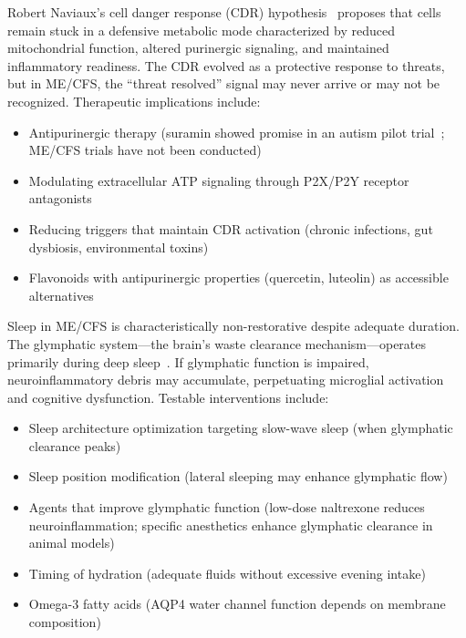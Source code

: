 \begin{hypothesis}
Robert Naviaux's cell danger response (CDR) hypothesis~\cite{Naviaux2014cdr} proposes that cells remain stuck in a defensive metabolic mode characterized by reduced mitochondrial function, altered purinergic signaling, and maintained inflammatory readiness. The CDR evolved as a protective response to threats, but in ME/CFS, the ``threat resolved'' signal may never arrive or may not be recognized. Therapeutic implications include:
\begin{itemize}
    \item Antipurinergic therapy (suramin showed promise in an autism pilot trial~\cite{Naviaux2018suraminpilot}; ME/CFS trials have not been conducted)
    \item Modulating extracellular ATP signaling through P2X/P2Y receptor antagonists
    \item Reducing triggers that maintain CDR activation (chronic infections, gut dysbiosis, environmental toxins)
    \item Flavonoids with antipurinergic properties (quercetin, luteolin) as accessible alternatives
\end{itemize}
\end{hypothesis}

\begin{hypothesis}
Sleep in ME/CFS is characteristically non-restorative despite adequate duration. The glymphatic system---the brain's waste clearance mechanism---operates primarily during deep sleep~\cite{Xie2013glymphatic}. If glymphatic function is impaired, neuroinflammatory debris may accumulate, perpetuating microglial activation and cognitive dysfunction. Testable interventions include:
\begin{itemize}
    \item Sleep architecture optimization targeting slow-wave sleep (when glymphatic clearance peaks)
    \item Sleep position modification (lateral sleeping may enhance glymphatic flow)
    \item Agents that improve glymphatic function (low-dose naltrexone reduces neuroinflammation; specific anesthetics enhance glymphatic clearance in animal models)
    \item Timing of hydration (adequate fluids without excessive evening intake)
    \item Omega-3 fatty acids (AQP4 water channel function depends on membrane composition)
\end{itemize}
\end{hypothesis}

